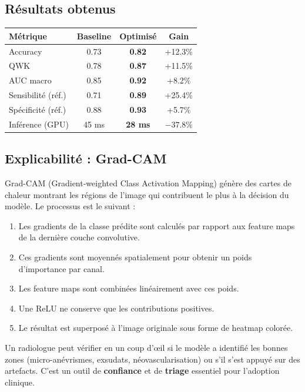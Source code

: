 ﻿\documentclass[11pt,a4paper]{article}
\begin{document}
\subsection{Résultats obtenus}

\begin{center}
\renewcommand{\arraystretch}{1.3}
\begin{tabular}{lccc}
\toprule
\textbf{Métrique} & \textbf{Baseline} & \textbf{Optimisé} & \textbf{Gain} \\
\midrule
Accuracy & 0.73 & \textbf{0.82} & +12.3\% \\
QWK & 0.78 & \textbf{0.87} & +11.5\% \\
AUC macro & 0.85 & \textbf{0.92} & +8.2\% \\
Sensibilité (réf.) & 0.71 & \textbf{0.89} & +25.4\% \\
Spécificité (réf.) & 0.88 & \textbf{0.93} & +5.7\% \\
Inférence (GPU) & 45 ms & \textbf{28 ms} & $-37.8\%$ \\
\bottomrule
\end{tabular}
\end{center}

\subsection{Explicabilité : Grad-CAM}

Grad-CAM (Gradient-weighted Class Activation Mapping) génère des cartes de chaleur montrant les régions de l'image qui contribuent le plus à la décision du modèle. Le processus est le suivant :

\begin{enumerate}[leftmargin=2em]
  \item Les gradients de la classe prédite sont calculés par rapport aux feature maps de la dernière couche convolutive.
  \item Ces gradients sont moyennés spatialement pour obtenir un poids d'importance par canal.
  \item Les feature maps sont combinées linéairement avec ces poids.
  \item Une ReLU ne conserve que les contributions positives.
  \item Le résultat est superposé à l'image originale sous forme de heatmap colorée.
\end{enumerate}

\begin{tipbox}
Un radiologue peut vérifier en un coup d'œil si le modèle a identifié les bonnes zones (micro-anévrismes, exsudats, néovascularisation) ou s'il s'est appuyé sur des artefacts. C'est un outil de \textbf{confiance} et de \textbf{triage} essentiel pour l'adoption clinique.
\end{tipbox}
\end{document}
